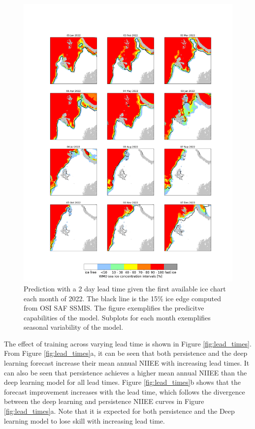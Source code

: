\documentclass[../main/thesis]{subfiles}
\begin{document}
\begin{figure}
    \centering
    \includegraphics[width=.855\textwidth]{Forecast_time_series}
    \caption{\label{fig:timeseries}Prediction with a 2 day lead time given the first available ice chart each month of 2022. The black line is the 15\% ice edge computed from OSI SAF SSMIS. The figure exemplifies the predicitve capabilities of the model. Subplots for each month exemplifies seasonal variability of the model.}
\end{figure}

The effect of training across varying lead time is shown in Figure \ref{fig:lead_times}. From Figure \ref{fig:lead_times}a, it can be seen that both persistence and the deep learning forecast increase their mean annual NIIEE with increasing lead times. It can also be seen that persistence achieves a higher mean annual NIIEE than the deep learning model for all lead times. Figure \ref{fig:lead_times}b shows that the forecast improvement increases with the lead time, which follows the divergence between the deep learning and persistence NIIEE curves in Figure \ref{fig:lead_times}a. Note that it is expected for both persistence and the Deep learning model to lose skill with increasing lead time.
\end{document}
